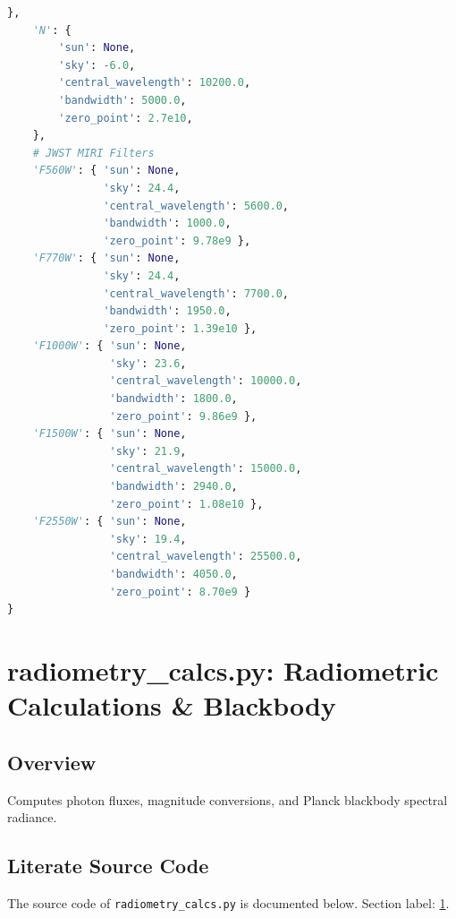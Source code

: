 \documentclass[10pt,a4paper]{report}
\begin{document}
\begin{lstlisting}[language=Python,caption={radiometry\_data.py Source Code},label={code:radiometrydata}]
    },
    'N': {
        'sun': None,
        'sky': -6.0,
        'central_wavelength': 10200.0,
        'bandwidth': 5000.0,
        'zero_point': 2.7e10,
    },
    # JWST MIRI Filters
    'F560W': { 'sun': None,
               'sky': 24.4,
               'central_wavelength': 5600.0,
               'bandwidth': 1000.0,
               'zero_point': 9.78e9 },
    'F770W': { 'sun': None,
               'sky': 24.4,
               'central_wavelength': 7700.0,
               'bandwidth': 1950.0, 
               'zero_point': 1.39e10 },
    'F1000W': { 'sun': None,
                'sky': 23.6,
                'central_wavelength': 10000.0,
                'bandwidth': 1800.0, 
                'zero_point': 9.86e9 },
    'F1500W': { 'sun': None,
                'sky': 21.9,
                'central_wavelength': 15000.0,
                'bandwidth': 2940.0, 
                'zero_point': 1.08e10 },
    'F2550W': { 'sun': None,
                'sky': 19.4,
                'central_wavelength': 25500.0,
                'bandwidth': 4050.0,
                'zero_point': 8.70e9 }
}

\end{lstlisting}



\chapter{radiometry\_calcs.py: Radiometric Calculations \& Blackbody}
\label{sec:radiometrycalcs}

\section*{Overview}
Computes photon fluxes, magnitude conversions, and Planck blackbody spectral radiance.

\section*{Literate Source Code}
The source code of \texttt{radiometry\_calcs.py} is documented below. Section label: \ref{sec:radiometrycalcs}.
\end{document}

